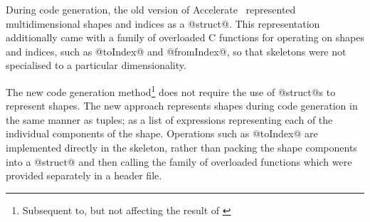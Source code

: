 During code generation, the old version of Accelerate~\cite{Chakravarty:2011fr}
represented multidimensional shapes and indices as a @struct@.
%
%
This representation additionally came with a family of overloaded C functions
for operating on shapes and indices, such as @toIndex@ and @fromIndex@, so that
skeletons were not specialised to a particular dimensionality.
%

The new code generation method\footnote{Subsequent to, but not affecting the
result of \cite{CliftonEverest:2014vi}} does not require the use of @struct@s to
represent shapes. The new approach represents shapes during code generation in
the same manner as tuples; as a list of expressions representing each of the
individual components of the shape. Operations such as @toIndex@ are implemented
directly in the skeleton, rather than packing the shape components into a
@struct@ and then calling the family of overloaded functions which were provided
separately in a header file.

